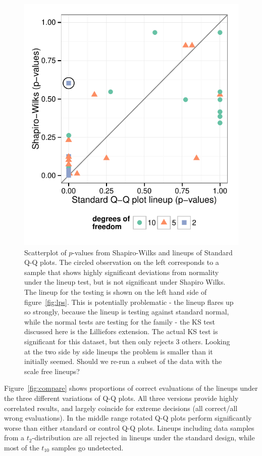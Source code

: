 \documentclass{article}\usepackage[]{graphicx}\usepackage[]{color}
\newcommand{\hh}[1]{{\color{magenta} #1}}
\begin{document}
\begin{figure}
\centering
\includegraphics[width=.5\textwidth]{figures/fig:visnorm.pdf} 
\caption{\label{fig:visnorm} Scatterplot of $p$-values from Shapiro-Wilks and lineups of Standard Q-Q plots. The circled observation on the left corresponds to a sample that shows highly significant deviations from normality under the lineup test, but is not significant under Shapiro Wilks. The lineup for the testing is shown on the left hand side of figure~\ref{fig:lps}.
\hh{This is potentially problematic - the lineup flares up so strongly, because the lineup is testing against standard normal, while the normal tests are testing for the family - the KS test discussed here is the Lilliefors extension. The actual KS test is significant for this dataset, but then only rejects 3 others. Looking at the two side by side lineups the problem is smaller than it initially seemed. Should we re-run a subset of the data with the scale free lineups?}}
\end{figure}
Figure~\ref{fig:compare} shows proportions of correct evaluations of the lineups under the three different variations of Q-Q plots. All three versions provide highly correlated results, and largely coincide for extreme decisions (all correct/all wrong evaluations). In the middle range rotated Q-Q plots perform significantly worse than either standard or control Q-Q plots. Lineups including data samples from a $t_2$-distribution  are all rejected in lineups under the standard design, while most of the $t_{10}$ samples go undetected. 
\end{document}
